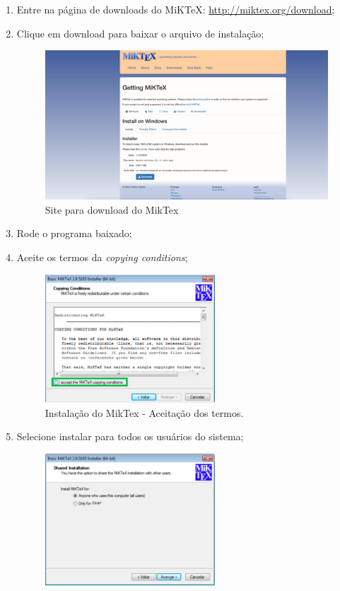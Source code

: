 \begin{enumerate}
\item Entre na página de downloads do MiKTeX: \url{http://miktex.org/download};
\item Clique em download para baixar o arquivo de instalação;
\begin{figure}[!ht]
  \centering
  \includegraphics[width=1.0\textwidth]{./fig/miktex01}
  \caption{Site para download do MikTex}
  \label{fig:miktex01}
\end{figure}
\item Rode o programa baixado;
\item Aceite os termos da \textit{copying conditions};
\begin{figure}[H]
  \centering
  \includegraphics[width=0.6\textwidth]{./fig/miktex02}
  \caption{Instalação do MikTex - Aceitação dos termos.}
\end{figure}
\item Selecione instalar para todos os usuários do sistema;
\begin{figure}[H]
  \centering
  \includegraphics[width=0.6\textwidth]{./fig/miktex03}

\end{figure}
\end{enumerate}
